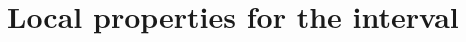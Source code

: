 \documentclass[12pt]{amsart}
\newtheorem{theorem}{Theorem}[section]
\theoremstyle{definition}
\newtheorem*{axiom}{Axiom}
\newcommand{\mbb}[1]{\mathbb{#1}}
\newcommand{\I}{\mbb I}
\newcommand{\ms}[1]{\mathsf{#1}}
\newcommand{\eq}{\leftrightarrow}
\begin{document}






\section{Local properties for the interval}\label{sec:local}
\end{document}

